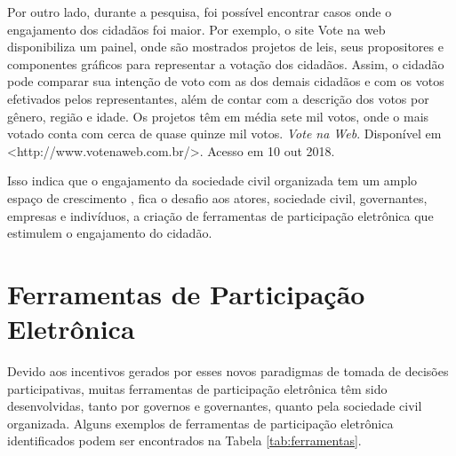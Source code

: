 \par
Por outro lado, durante a pesquisa, foi possível encontrar casos onde o engajamento dos cidadãos foi maior. Por exemplo, o site Vote na web disponibiliza um painel, onde são mostrados projetos de leis, 
seus propositores e componentes gráficos para representar a votação dos cidadãos.
Assim, o cidadão pode comparar sua intenção de voto com as dos demais cidadãos e com os votos efetivados pelos representantes, além de contar com a descrição dos votos por gênero,
região e idade. Os projetos têm em média sete mil votos, onde o mais votado conta com cerca de quase quinze mil votos. \textit{Vote na Web}. Disponível em <http://www.votenaweb.com.br/>.
Acesso em 10 out 2018.

\par
Isso indica que o engajamento da sociedade civil organizada tem um amplo espaço de crescimento \cite{o2011government}, fica o desafio aos atores, sociedade civil, governantes, 
empresas e indivíduos, a criação de ferramentas de participação eletrônica que estimulem o engajamento do cidadão.



\section{Ferramentas de Participação Eletrônica}
\label{sec:e-part tools}
Devido aos incentivos gerados por esses novos paradigmas de tomada de decisões participativas, muitas ferramentas de participação eletrônica têm sido desenvolvidas,
tanto por governos e governantes, quanto pela sociedade civil organizada. Alguns exemplos de ferramentas de participação eletrônica identificados podem ser encontrados na Tabela \ref{tab:ferramentas}.

\vspace{1cm}

